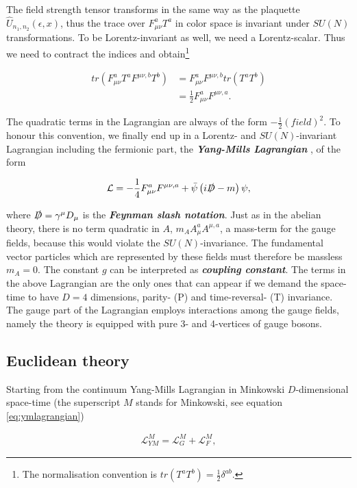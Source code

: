 \documentclass{article}
\theoremstyle{plain} %
\theoremstyle{convention} %
\theoremstyle{remark} %
\def\df#1{\textbf{\textit{#1}}}
\numberwithin{equation}{section}
\begin{document}
The field strength tensor transforms in the same way as the plaquette $\hat{U}_{n_1,n_2}(\epsilon,x)$, thus the trace over $F_{\mu \nu}^a T^a$ in color space is invariant under $SU(N)$ transformations. To be Lorentz-invariant as well, we need a Lorentz-scalar. Thus we need to contract the indices and obtain\footnote{The normalisation convention is $tr(T^a T^b) = \frac{1}{2} \delta^{ab}$.}

\begin{align}
    tr( F_{\mu \nu}^a T^a F^{\mu \nu, b} T^b) &= F_{\mu \nu}^a F^{\mu \nu, b} tr(T^a T^b) \\
    &= \frac{1}{2} F_{\mu \nu}^a F^{\mu \nu, a}.
\end{align}

The quadratic terms in the Lagrangian are always of the form $-\frac{1}{2} (\textit{field})^2$. To honour this convention, we finally end up in a Lorentz- and $SU(N)$-invariant Lagrangian including the fermionic part, the \df{Yang-Mills Lagrangian} \cite{yang1954}, of the form

\begin{align}
    \mathcal{L} = -\frac{1}{4} F_{\mu \nu}^a F^{\mu \nu, a} + \bar{\psi} \left( i \slashed{D} - m \right) \psi, \label{eq:ymlagrangian}
\end{align}

where $\slashed{D} = \gamma^{\mu} D_{\mu}$ is the \df{Feynman slash notation}. Just as in the abelian theory, there is no term quadratic in $A$, $m_A A_{\mu}^a A^{\mu,a}$, a mass-term for the gauge fields, because this would violate the $SU(N)$-invariance. The fundamental vector particles which are represented by these fields must therefore be massless $m_A = 0$. The constant $g$ can be interpreted as \df{coupling constant}. The terms in the above Lagrangian are the only ones that can appear if we demand the space-time to have $D=4$ dimensions, parity- (P) and time-reversal- (T) invariance. The gauge part of the Lagrangian employs interactions among the gauge fields, namely the theory is equipped with pure 3- and 4-vertices of gauge bosons.

\subsection{Euclidean theory}

Starting from the continuum Yang-Mills Lagrangian in Minkowski $D$-dimensional space-time (the superscript $M$ stands for Minkowski, see equation \eqref{eq:ymlagrangian})

\begin{align}
    \mathcal{L}_{YM}^M = \mathcal{L}_G^M + \mathcal{L}_F^M, \label{eq:cont_ym_lagrangian}
\end{align}
\end{document}
